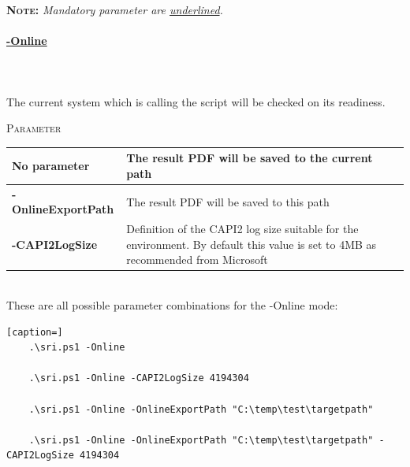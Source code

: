 \vspace{0.5cm}
\textsc{\textbf{Note:}}\textit{ Mandatory parameter are \underline{underlined}.}
\vspace{0.5cm}
\begin{tcolorbox}
    \paragraph{\underline{-Online}} \ \\\\
    The current system which is calling the script will be checked on its readiness.
    \vspace{0.3cm}
    \begin{center}
        \textsc{Parameter}
    \end{center}
    \vspace{-0.5cm}
    \begin{table}[H]
        \def\arraystretch{2}
        \centering
        \begin{tabular}{ p{4cm}  p{10cm} }  \hline
            \textbf{No parameter} & The result PDF will be saved to the current path \\ \hline
            \textbf{-OnlineExportPath} & The result PDF will be saved to this path \\ \hline
            \textbf{-CAPI2LogSize} & Definition of the CAPI2 log size suitable for the environment. By default this value is set to 4MB as recommended from Microsoft  \\ \hline
        \end{tabular}
    \end{table}
\end{tcolorbox} \ \\
These are all possible parameter combinations for the -Online mode: \ \\
\begin{lstlisting}[caption=]
    .\sri.ps1 -Online	

    .\sri.ps1 -Online -CAPI2LogSize 4194304

    .\sri.ps1 -Online -OnlineExportPath "C:\temp\test\targetpath"

    .\sri.ps1 -Online -OnlineExportPath "C:\temp\test\targetpath" -CAPI2LogSize 4194304
\end{lstlisting}

